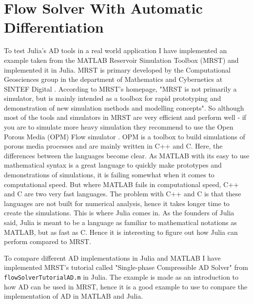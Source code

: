 \chapter{Flow Solver With Automatic Differentiation}
\label{ch:FlowSolver}
To test Julia's AD tools in a real world application I have implemented an example taken from the MATLAB Reservoir Simulation Toolbox (MRST) and implemented it in Julia. MRST is primary developed by the Computational Geosciences group in the department of Mathematics and Cybernetics at SINTEF Digital \emph{\cite{mrstHomepage}}. According to MRST's homepage, "MRST is not primarily a simulator, but is mainly intended as a toolbox for rapid prototyping and demonstration of new simulation methods and modelling concepts". So although most of the tools and simulators in MRST are very efficient and perform well - if you are to simulate more heavy simulation they recommend to use the Open Porous Media (OPM) Flow simulator \emph{\citep{OPM}}. OPM is a toolbox to build simulations of porous media processes and are mainly written in C++ and C. Here, the differences between the languages become clear. As MATLAB with its easy to use mathematical syntax is a great language to quickly make prototypes and demonstrations of simulations, it is failing somewhat when it comes to computational speed. But where MATLAB fails in computational speed, C++ and C are two very fast languages. The problem with C++ and C is that these languages are not built for numerical analysis, hence it takes longer time to create the simulations. This is where Julia comes in. As the founders of Julia said, Julia is meant to be a language as familiar to mathematical notations as MATLAB, but as fast as C. Hence it is interesting to figure out how Julia can perform compared to MRST.

To compare different AD implementations in Julia and MATLAB I have implemented MRST's tutorial called "Single-phase Compressible AD Solver" from \texttt{flowSolverTutorialAD.m} \emph{\citep{flowSolverADExample}} in Julia. The example is made as an introduction to how AD can be used in MRST, hence it is a good example to use to compare the implementation of AD in MATLAB and Julia. 

